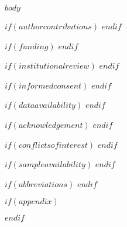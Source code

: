 \documentclass[$journal$,$type$,$status$,moreauthors,pdftex]{Definitions/mdpi}
\begin{document}

$body$

\vspace{6pt}




$if(authorcontributions)$
$endif$

$if(funding)$
$endif$

$if(institutionalreview)$
$endif$

$if(informedconsent)$
$endif$

$if(dataavailability)$
$endif$

$if(acknowledgement)$
$endif$

$if(conflictsofinterest)$
$endif$

$if(sampleavailability)$
$endif$


$if(abbreviations)$
$endif$

$if(appendix)$

$endif$
\end{document}
